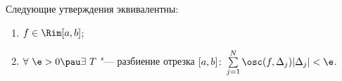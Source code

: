 
 	Следующие утверждения эквивалентны:
 	\begin{enumerate}
 	  \item $f\in\Rim[a,b]$;
 	  \item $\forall\ \e>0\pau\exists\  T$ "--- разбиение отрезка $[a,b]\colon\sum\limits_{j=1}^N\osc(f,\Delta_j)|\Delta_j|<\e$.
 	\end{enumerate}
 